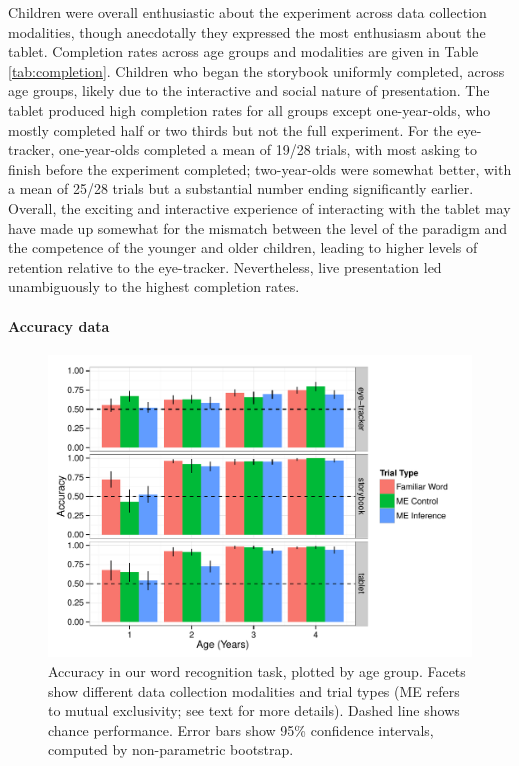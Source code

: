\documentclass[man,noapacite]{apa2}
\begin{document}
Children were overall enthusiastic about the experiment across data collection modalities, though anecdotally they expressed the most enthusiasm about the tablet. Completion rates across age groups and modalities are given in Table \ref{tab:completion}. Children who began the storybook uniformly completed, across age groups, likely due to the interactive and social nature of presentation. The tablet produced high completion rates for all groups except one-year-olds, who mostly completed half or two thirds but not the full experiment. For the eye-tracker, one-year-olds completed a mean of 19/28 trials, with most asking to finish before the experiment completed; two-year-olds were somewhat better, with a mean of 25/28 trials but a substantial number ending significantly earlier. Overall, the exciting and interactive experience of interacting with the tablet may have made up somewhat for the mismatch between the level of the paradigm and the competence of the younger and older children, leading to higher levels of retention relative to the eye-tracker. Nevertheless, live presentation led unambiguously to the highest completion rates.

\paragraph{Accuracy data} 

\begin{figure}[t] 
  \begin{center} 
    \includegraphics[width=5in]{figures/accuracy.pdf} 
    \caption{\label{fig:accuracy} Accuracy in our word recognition task, plotted by age group. Facets show different data collection modalities and trial types (ME refers to mutual exclusivity; see text for more details). Dashed line shows chance performance. Error bars show 95\% confidence intervals, computed by non-parametric bootstrap. }
  \end{center} 
\end{figure}
\end{document}
